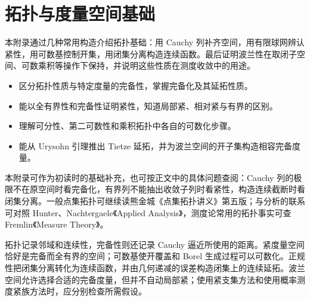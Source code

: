 \chapter{拓扑与度量空间基础}
\label{b1:app:A}

\begin{chapterabstract}
本附录通过几种常用构造介绍拓扑基础：用 Cauchy 列补齐空间，用有限球网辨认紧性，用可数基控制开集，用闭集分离构造连续函数。最后证明波兰性在取闭子空间、可数乘积等操作下保持，并说明这些性质在测度收敛中的用途。
\end{chapterabstract}

\begin{learninggoals}
\begin{itemize}
\item\label{b1:item:A1-goal-metric}区分拓扑性质与特定度量的完备性，掌握完备化及其延拓性质。
\item\label{b1:item:A1-goal-compact}能以全有界性和完备性证明紧性，知道局部紧、相对紧与有界的区别。
\item\label{b1:item:A1-goal-countable}理解可分性、第二可数性和乘积拓扑中各自的可数化步骤。
\item\label{b1:item:A1-goal-extension}能从 Urysohn 引理推出 Tietze 延拓，并为波兰空间的开子集构造相容完备度量。
\end{itemize}
\end{learninggoals}

本附录可作为初读时的基础补充，也可按正文中的具体问题查阅：Cauchy 列的极限不在原空间时看完备化，有界列不能抽出收敛子列时看紧性，构造连续截断时看闭集分离。一般点集拓扑可继续读熊金城《点集拓扑讲义》第五版\cite[第3章, 第5--7章]{Xiong2020Topology}；与分析的联系可对照 Hunter、Nachtergaele《Applied Analysis》\cite[Chapters 1, 2, and 4]{Hunter2001Applied}，测度论常用的拓扑事实可查 Fremlin《Measure Theory》\cite[Appendix to Volume 4, \S4A2]{Fremlin2016Measure}。







\begin{chaptersummary}
拓扑记录邻域和连续性，完备性则还记录 Cauchy 逼近所使用的距离。紧度量空间恰好是完备而全有界的空间；可数基使开覆盖和 Borel 生成过程可以可数化。正规性把闭集分离转化为连续函数，并由几何递减的误差构造闭集上的连续延拓。波兰空间允许选择合适的完备度量，但并不自动局部紧；使用紧支集方法和使用概率测度紧族方法时，应分别检查所需假设。
\end{chaptersummary}

